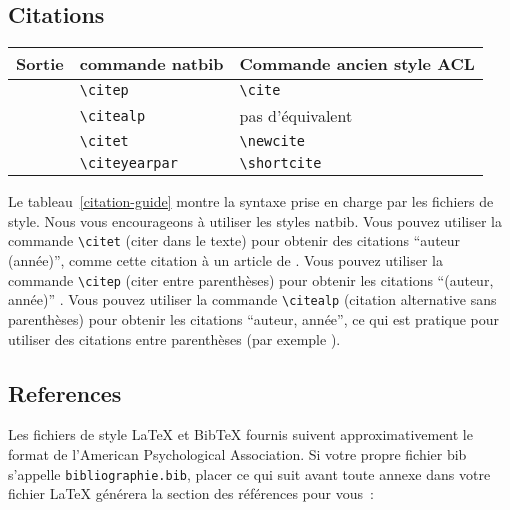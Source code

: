 \documentclass[11pt,french]{article}
\begin{document}
\subsection{Citations}

\begin{table*}
\centering
\begin{tabular}{lll}
\hline
\textbf{Sortie} & \textbf{commande natbib } & \textbf{Commande ancien style ACL}\\
\hline
\citep{Gusfield:97} & \verb|\citep| & \verb|\cite| \\
\citealp{Gusfield:97} & \verb|\citealp| & pas d'équivalent \\
\citet{Gusfield:97} & \verb|\citet| & \verb|\newcite| \\
\citeyearpar{Gusfield:97} & \verb|\citeyearpar| & \verb|\shortcite| \\
\hline
\end{tabular}
\caption{\label{citation-guide}
Commandes de citation prises en charge par le fichier de style.
Le style est basé sur le package natbib et prend en charge toutes les commandes de citation natbib.
Il prend également en charge les commandes définies dans les fichiers de style Humanistica précédents pour la compatibilité.
}
\end{table*}

Le tableau~\ref{citation-guide} montre la syntaxe prise en charge par les fichiers de style.
Nous vous encourageons à utiliser les styles natbib.
Vous pouvez utiliser la commande \verb|\citet| (citer dans le texte) pour obtenir des citations ``auteur (année)'', comme cette citation à un article de \citet{Gusfield:97}.
Vous pouvez utiliser la commande \verb|\citep| (citer entre parenthèses) pour obtenir les citations ``(auteur, année)'' \citep{Gusfield:97}.
Vous pouvez utiliser la commande \verb|\citealp| (citation alternative sans parenthèses) pour obtenir les citations ``auteur, année'', ce qui est pratique pour utiliser des citations entre parenthèses (par exemple \citealp{Gusfield:97}).

\subsection{References}

\nocite{Ando2005,andrew2007scalable,rasooli-tetrault-2015}

Les fichiers de style \LaTeX{} et Bib\TeX{} fournis suivent approximativement le format de l'American Psychological Association.
Si votre propre fichier bib s'appelle \texttt{bibliographie.bib}, placer ce qui suit avant toute annexe dans votre fichier \LaTeX{} générera la section des références pour vous :
\begin{quote}
\begin{verbatim}

\end{verbatim}
\end{quote}
\end{document}
